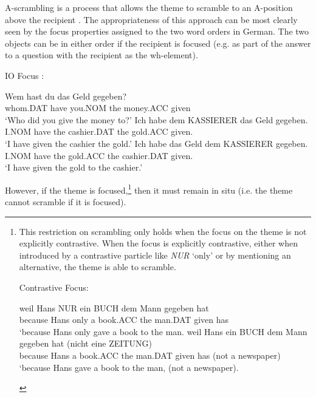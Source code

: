 A-scrambling is a process that allows the theme to scramble to an A-position above the recipient \citep{Czepluch.1990,Choi.1996,McGinnis.1998}. The appropriateness of this approach can be most clearly seen by the focus properties assigned to the two word orders in German. The two objects can be in either order if the recipient is focused (e.g. as part of the answer to a question with the recipient as the wh-element).
\begin{exe}
\ex IO Focus \citep{Choi.1996}:
\begin{xlist}
\ex \gll Wem hast du das Geld gegeben?\\
whom.DAT have you.NOM the money.ACC given\\
\trans `Who did you give the money to?'
\ex \gll Ich habe dem KASSIERER das Geld gegeben.\\
I.NOM have the cashier.DAT the gold.ACC given.\\
\trans `I have given the cashier the gold.'
\ex \gll Ich habe das Geld dem KASSIERER gegeben.\\
I.NOM have the gold.ACC the cashier.DAT given.\\
\trans `I have given the gold to the cashier.'
\end{xlist}
\end{exe}
However, if the theme is focused,\footnote{This restriction on scrambling only holds when the focus on the theme is not explicitly contrastive. When the focus is explicitly contrastive, either when introduced by a contrastive particle like \emph{NUR} `only' or by mentioning an alternative, the theme is able to scramble.
\begin{exe}
\ex Contrastive Focus:
\begin{xlist}
\ex \gll weil Hans NUR ein BUCH dem Mann gegeben hat\\
because Hans only a book.ACC the man.DAT given has\\
\trans `because Hans only gave a book to the man.
\ex \gll weil Hans ein BUCH dem Mann gegeben hat (nicht eine ZEITUNG)\\
because Hans a book.ACC the man.DAT given has (not a newspaper)\\
\trans `because Hans gave a book to the man, (not a newspaper).
\end{xlist}
\end{exe}} then it must remain in situ (i.e. the theme cannot scramble if it is focused). 
